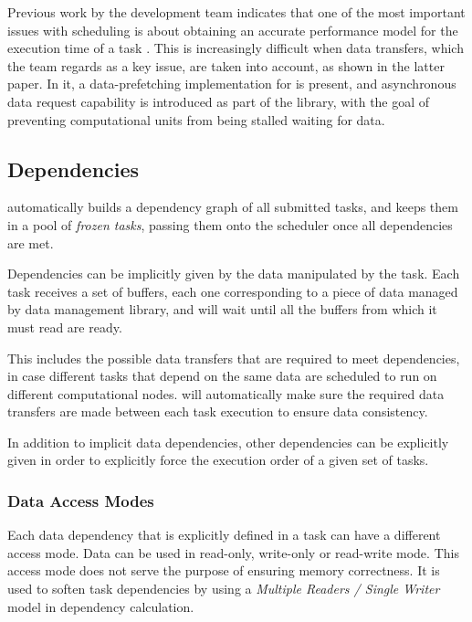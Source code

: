 \documentclass[main.tex]{subfiles}
\begin{document}
Previous work by the \starpu development team indicates that one of the most important issues with scheduling is about obtaining an accurate performance model for the execution time of a task \cite{augonnet2010data,augonnet2010automatic}. This is increasingly difficult when data transfers, which the team regards as a key issue, are taken into account, as shown in the latter paper. In it, a data-prefetching implementation for \gpus is present, and asynchronous data request capability is introduced as part of the \starpu library, with the goal of preventing computational units from being stalled waiting for data.

\subsection{Dependencies}

\starpu automatically builds a dependency graph of all submitted tasks, and keeps them in a pool of \emph{frozen tasks}, passing them onto the scheduler once all dependencies are met.

Dependencies can be implicitly given by the data manipulated by the task. Each task receives a set of buffers, each one corresponding to a piece of data managed by \starpu data management library, and will wait until all the buffers from which it must read are ready.

This includes the possible data transfers that are required to meet dependencies, in case different tasks that depend on the same data are scheduled to run on different computational nodes. \starpu will automatically make sure the required data transfers are made between each task execution to ensure data consistency.

In addition to implicit data dependencies, other dependencies can be explicitly given in order to explicitly force the execution order of a given set of tasks.

\subsubsection{Data Access Modes} \label{sec:starpu:data_access}

Each data dependency that is explicitly defined in a task can have a different access mode. Data can be used in read-only, write-only or read-write mode. This access mode does not serve the purpose of ensuring memory correctness. It is used to soften task dependencies by using a \emph{Multiple Readers / Single Writer} model in dependency calculation.
\end{document}

